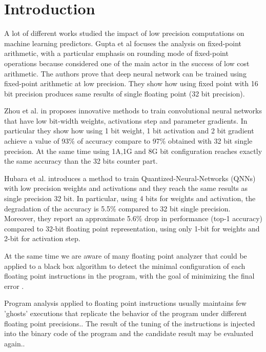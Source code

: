 \documentclass[sigplan,review,anonymous=false]{acmart}\settopmatter{printfolios=true,printccs=false,printacmref=false}
\begin{document}
\section{Introduction}
A lot of different works studied the impact of low precision computations on machine learning predictors. 
Gupta et al\cite{gupta} focuses the analysis on fixed-point arithmetic, with a particular emphasis on rounding mode of fixed-point operations because considered one of the main actor in the success of low cost arithmetic. The authors prove that deep neural network can be trained using fixed-point arithmetic at low precision. They show how using fixed point with 16 bit precision produces same results of single floating point (32 bit precision). 

Zhou et al. in \cite{dorefa} proposes innovative  methods to train convolutional neural networks that
have low bit-width weights, activations step and parameter gradients. In particular they show how using 1 bit weight, 1 bit activation and 2 bit gradient achieve a value of 93\% of accuracy compare to 97\% obtained with 32 bit single precision. 
At the same time using 1A,1G and 8G bit configuration reaches exactly the same accuracy than the 32 bits counter part.

Hubara et al.\cite{Hubara} introduces a method to train Quantized-Neural-Networks (QNNs) with low precision weights and activations and they reach the same results as single precision 32 bit. 
In particular, using 4 bits for weights and activation, the degradation of the accuracy is 5.5\% compared to 32 bit single precision. Moreover, they report an approximate 5.6\% drop in performance (top-1 accuracy) compared to 32-bit floating
point representation, using only 1-bit for weights and 2-bit for activation step.

At the same time we are aware of many floating point analyzer that could be applied to a black box algorithm to detect the minimal configuration of each floating point instructions in the program, with the goal of minimizing the final error \cite{reducelam}\cite{mixpreclam}\cite{precimonious}\cite{blame}. 

Program analysis applied to floating point instructions usually maintains few 'ghosts' executions that replicate the behavior of the program under different floating point precisions.\cite{blame}\cite{precimonious}. The result of the tuning of the instructions is injected into the binary code of the program and the candidate result may be evaluated again.\cite{mixpreclam}\cite{reducelam}.
\end{document}

